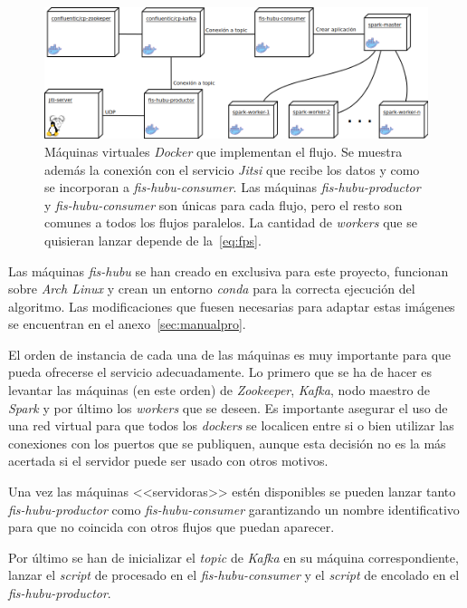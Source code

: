 \begin{figure}
	\centering
	\includegraphics[width=\textwidth]{img/DespliegueDocker.png}
	\caption[Máquinas virtuales \textit{Docker} que implementan el flujo.]{Máquinas virtuales \textit{Docker} que implementan el flujo. Se muestra además la conexión con el servicio \textit{Jitsi} que recibe los datos y como se incorporan a \textit{fis-hubu-consumer}. Las máquinas \textit{fis-hubu-productor} y \textit{fis-hubu-consumer} son únicas para cada flujo, pero el resto son comunes a todos los flujos paralelos. La cantidad de \textit{workers} que se quisieran lanzar depende de la~\autoref{eq:fps}.}
	\label{fig:despligueDocker}
\end{figure}

Las máquinas \textit{fis-hubu} se han creado en exclusiva para este proyecto, funcionan sobre \textit{Arch Linux} y crean un entorno \textit{conda} para la correcta ejecución del algoritmo. Las modificaciones que fuesen necesarias para adaptar estas imágenes se encuentran en el anexo~\ref{sec:manualpro}. 

El orden de instancia de cada una de las máquinas es muy importante para que pueda ofrecerse el servicio adecuadamente. Lo primero que se ha de hacer es levantar las máquinas (en este orden) de \textit{Zookeeper}, \textit{Kafka}, nodo maestro de \textit{Spark} y por último los \textit{workers} que se deseen. Es importante asegurar el uso de una red virtual para que todos los \textit{dockers} se localicen entre si o bien utilizar las conexiones con los puertos que se publiquen, aunque esta decisión no es la más acertada si el servidor puede ser usado con otros motivos.

Una vez las máquinas <<servidoras>> estén disponibles se pueden lanzar tanto \textit{fis-hubu-productor} como \textit{fis-hubu-consumer} garantizando un nombre identificativo para que no coincida con otros flujos que puedan aparecer.

Por último se han de inicializar el \textit{topic} de \textit{Kafka} en su máquina correspondiente, lanzar el \textit{script} de procesado en el \textit{fis-hubu-consumer} y el \textit{script} de encolado en el \textit{fis-hubu-productor}.

